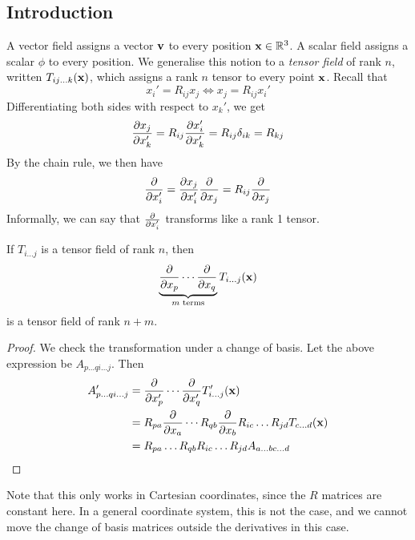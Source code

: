 \subsection{Introduction}
A vector field assigns a vector \(\vb v\) to every position \(\vb x \in \mathbb R^3\).
A scalar field assigns a scalar \(\phi\) to every position.
We generalise this notion to a \textit{tensor field} of rank \(n\), written \(T_{ij\dots k}(\vb x)\), which assigns a rank \(n\) tensor to every point \(\vb x\).
Recall that
\[
	x_i' = R_{ij}x_j \iff x_j = R_{ij}x_i'
\]
Differentiating both sides with respect to \(x_k'\), we get
\[
	\pdv{x_j}{x_k'} = R_{ij} \pdv{x_i'}{x_k'} = R_{ij} \delta_{ik} = R_{kj}
\]
By the chain rule, we then have
\[
	\pdv{x_i'} = \pdv{x_j}{x_i'} \pdv{x_j} = R_{ij} \pdv{x_j}
\]
Informally, we can say that \(\pdv{x_i'}\) transforms like a rank 1 tensor.
\begin{proposition}
	If \(T_{i\dots j}\) is a tensor field of rank \(n\), then
	\[
		\underbrace{\pdv{x_p} \cdots \pdv{x_q}}_{m \text{ terms}} T_{i\dots j}(\vb x)
	\]
	is a tensor field of rank \(n+m\).
\end{proposition}
\begin{proof}
	We check the transformation under a change of basis.
	Let the above expression be \(A_{p\dots q i \dots j}\).
	Then
	\begin{align*}
		A_{p\dots q i\dots j}' & = \pdv{x_p'} \cdots \pdv{x_q'} T_{i\dots j}'(\vb x)                            \\
		                       & = R_{pa}\pdv{x_a} \cdots R_{qb}\pdv{x_b} R_{ic}\dots R_{jd}T_{c\dots d}(\vb x) \\
		                       & = R_{pa}\dots R_{qb}R_{ic}\dots R_{jd} A_{a\dots bc\dots d}
	\end{align*}
\end{proof}
Note that this only works in Cartesian coordinates, since the \(R\) matrices are constant here.
In a general coordinate system, this is not the case, and we cannot move the change of basis matrices outside the derivatives in this case.

